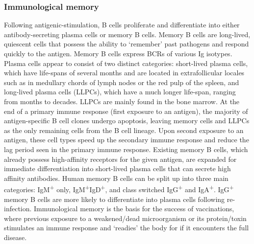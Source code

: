 \subsubsection{Immunological memory}
Following antigenic-stimulation, B cells proliferate and differentiate into either antibody-secreting plasma cells or memory B cells.
Memory B cells are long-lived, quiescent cells that possess the ability to `remember' past pathogens and respond quickly to the antigen\cite{palm2019remembrance}.
Memory B cells express BCRs of various Ig isotypes.
Plasma cells appear to consist of two distinct categories: short-lived plasma cells, which have life-spans of several months and are located in extrafollicular locales such as in medullary chords of lymph nodes or the red pulp of the spleen, and long-lived plasma cells (LLPCs), which have a much longer life-span, ranging from months to decades\cite{bortnick2013and, andraud2012living}.
LLPCs are mainly found in the bone marrow\cite{bortnick2013and, andraud2012living}.
At the end of a primary immune response (first exposure to an antigen), the majority of antigen-specific B cell clones undergo apoptosis, leaving memory cells and LLPCs as the only remaining cells from the B cell lineage.
Upon second exposure to an antigen, these cell types speed up the secondary immune response and reduce the lag period seen in the primary immune response.
Existing memory B cells, which already possess high-affinity receptors for the given antigen, are expanded for immediate differentiation into short-lived plasma cells that can secrete high affinity antibodies.
Human memory B cells can be split up into three main categories: IgM\textsuperscript{+} only, IgM\textsuperscript{+}IgD\textsuperscript{+}, and class switched IgG\textsuperscript{+} and IgA\textsuperscript{+}\cite{palm2019remembrance}.
IgG\textsuperscript{+} memory B cells are more likely to differentiate into plasma cells following re-infection.
Immunological memory is the basis for the success of vaccinations, where previous exposure to a weakened/dead microorganism or its protein/toxin stimulates an immune response and `readies' the body for if it encounters the full disease.

